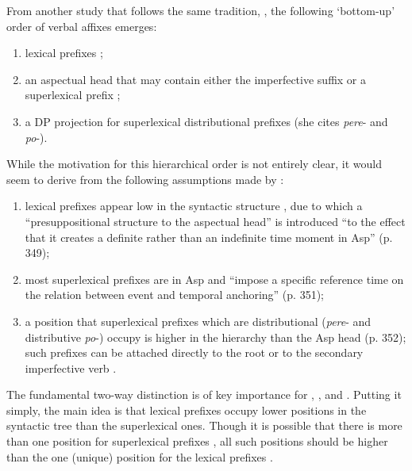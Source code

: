 From another study that follows the same tradition, \citealt{Ramchand:04}, the following `bottom-up' order of verbal affixes emerges:

\begin{enumerate}
\item lexical prefixes ;
\item an aspectual head that may contain either the imperfective suffix   or a superlexical prefix ;
\item a DP projection for superlexical distributional  prefixes (she cites \textit{pere}- and \textit{po}-). 
\end{enumerate}
While the motivation for this hierarchical order is not entirely clear, it would seem to derive from the following assumptions made by \citet{Ramchand:04}: 
\begin{enumerate}
\item lexical prefixes  appear low in the syntactic structure , due to which a ``presuppositional structure to the aspectual head'' is introduced ``to the effect that it creates a definite rather than an indefinite time moment in Asp'' (p. 349);
\item most superlexical prefixes  are in Asp and ``impose a specific reference time on the relation between event and temporal anchoring'' (p. 351);
\item a position that superlexical prefixes  which are distributional  (\textit{pere}- and distributive  \textit{po}-) occupy is higher in the hierarchy than the Asp head (p. 352); such prefixes can be attached directly to the root or to the secondary imperfective  verb .
\end{enumerate}
The fundamental two-way distinction is of key importance for \citet{Romanova:04}, \citet{Svenonius:04b}, and \citet{Ramchand:04}. Putting it simply, the main idea is that lexical prefixes  occupy lower positions in the syntactic tree  than the superlexical ones. Though it is possible that there is more than one position for superlexical prefixes , all such positions should be higher than the one (unique) position for the lexical prefixes . 

